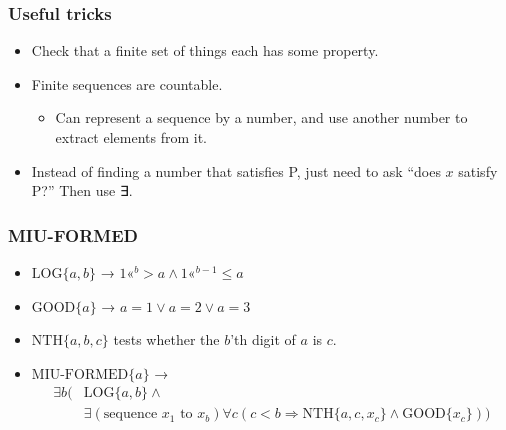 \documentclass[mathserif]{beamer}
\newcommand{\shl}[1]{\text{«}^{#1}}
\begin{document}
\begin{frame}
\frametitle{Useful tricks}
\label{sec-4-2}
\begin{itemize}

\item Check that a finite set of things each has some property.\\
\label{sec-4-2-1}%
\item Finite sequences are countable.
\label{sec-4-2-2}%
\begin{itemize}

\item Can represent a sequence by a number, and use another number to extract elements from it.\\
\label{sec-4-2-2-1}%
\end{itemize} %

\item Instead of finding a number that satisfies P, just need to ask ``does $x$ satisfy P?'' Then use ∃.\\
\label{sec-4-2-3}%
\end{itemize} %
\end{frame}
\begin{frame}
\frametitle{MIU-FORMED}
\label{sec-4-3}
\begin{itemize}

\item $\text{LOG}\{a,b\}$ → $1\shl{b} > a ∧ 1\shl{b-1} ≤ a$\\
\label{sec-4-3-1}%
\item $\text{GOOD}\{a\}$ → $a = 1 ∨ a = 2 ∨ a = 3$\\
\label{sec-4-3-2}%
\item $\text{NTH}\{a,b,c\}$ tests whether the $b$'th digit of $a$ is $c$.\\
\label{sec-4-3-3}%
\item $\text{MIU-FORMED}\{a\}$ →\\
\label{sec-4-3-4}%
\begin{align*}
∃b(&\text{LOG}\{a,b\} ∧\\
   &∃(\text{sequence }x_1\text{ to }x_b) ∀c (c < b ⇒ \text{NTH}\{a,c,x_c\} ∧ \text{GOOD}\{x_c\}))
\end{align*}
\end{itemize} %
\end{frame}
\end{document}
